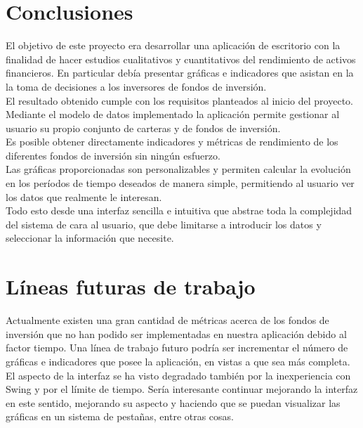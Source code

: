 \documentclass[12pt, a4paper]{book}
\begin{document}
\section{Conclusiones}

El objetivo de este proyecto era desarrollar una aplicación de escritorio con la finalidad de hacer estudios cualitativos y cuantitativos del rendimiento de activos financieros. En particular debía presentar gráficas e indicadores que asistan en la la toma de decisiones a los inversores de fondos de inversión.\\

El resultado obtenido cumple con los requisitos planteados al inicio del proyecto. Mediante el modelo de datos implementado la aplicación permite gestionar al usuario su propio conjunto de carteras y de fondos de inversión.\\

Es posible obtener directamente indicadores y métricas de rendimiento de los diferentes fondos de inversión sin ningún esfuerzo.\\

Las gráficas proporcionadas son personalizables y permiten calcular la evolución en los períodos de tiempo deseados de manera simple, permitiendo al usuario ver los datos que realmente le interesan.\\

Todo esto desde una interfaz sencilla e intuitiva que abstrae toda la complejidad del sistema de cara al usuario, que debe limitarse a introducir los datos y seleccionar la información que necesite.
 
 \newpage
 
\section{Líneas futuras de trabajo}

Actualmente existen una gran cantidad de métricas acerca de los fondos de inversión que no han podido ser implementadas en nuestra aplicación debido al factor tiempo. Una línea de trabajo futuro podría ser incrementar el número de gráficas e indicadores que posee la aplicación, en vistas a que sea más completa.\\


El aspecto de la interfaz se ha visto degradado también por la inexperiencia con Swing y por el límite de tiempo. Sería interesante continuar mejorando la interfaz en este sentido, mejorando su aspecto y haciendo que se puedan visualizar las gráficas en un sistema de pestañas, entre otras cosas.\\
\end{document}

